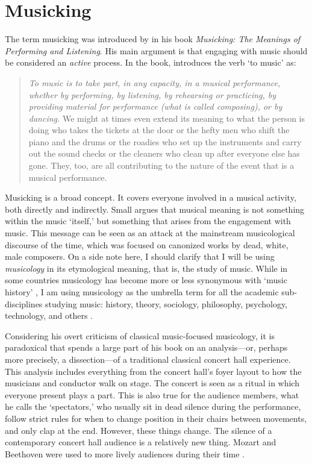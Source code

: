 \section{Musicking}

The term musicking was introduced by \citet{small_musicking:_1998} in his book \emph{Musicking: The Meanings of Performing and Listening}. His main argument is that engaging with music should be considered an \emph{active} process. In the book, \citet[p.9]{small_musicking:_1998} introduces the verb `to music' as:

\begin{quotation}
\emph{To music is to take part, in any capacity, in a musical performance, whether by performing, by listening, by rehearsing or practicing, by providing material for performance (what is called composing), or by dancing.} We might at times even extend its meaning to what the person is doing who takes the tickets at the door or the hefty men who shift the piano and the drums or the roadies who set up the instruments and carry out the sound checks or the cleaners who clean up after everyone else has gone. They, too, are all contributing to the nature of the event that is a musical performance.
\end{quotation}

Musicking is a broad concept. It covers everyone involved in a musical activity, both directly and indirectly. Small argues that musical meaning is not something within the music `itself,' but something that arises from the engagement with music. This message can be seen as an attack at the mainstream musicological discourse of the time, which was focused on canonized works by dead, white, male composers. On a side note here, I should clarify that I will be using \emph{musicology} in its etymological meaning, that is, the study of music. While in some countries musicology has become more or less synonymous with `music history' \citep{kerman_contemplating_1985}, I am using musicology as the umbrella term for all the academic sub-disciplines studying music: history, theory, sociology, philosophy, psychology, technology, and others \citep{parncutt_systematic_2007}.

Considering his overt criticism of classical music-focused musicology, it is paradoxical that \citet{small_musicking:_1998} spends a large part of his book on an analysis---or, perhaps more precisely, a dissection---of a traditional classical concert hall experience. This analysis includes everything from the concert hall's foyer layout to how the musicians and conductor walk on stage. The concert is seen as a ritual in which everyone present plays a part. This is also true for the audience members, what he calls the `spectators,' who usually sit in dead silence during the performance, follow strict rules for when to change position in their chairs between movements, and only clap at the end. However, these things change. The silence of a contemporary concert hall audience is a relatively new thing. Mozart and Beethoven were used to more lively audiences during their time \citep[p.44]{small_musicking:_1998}.

